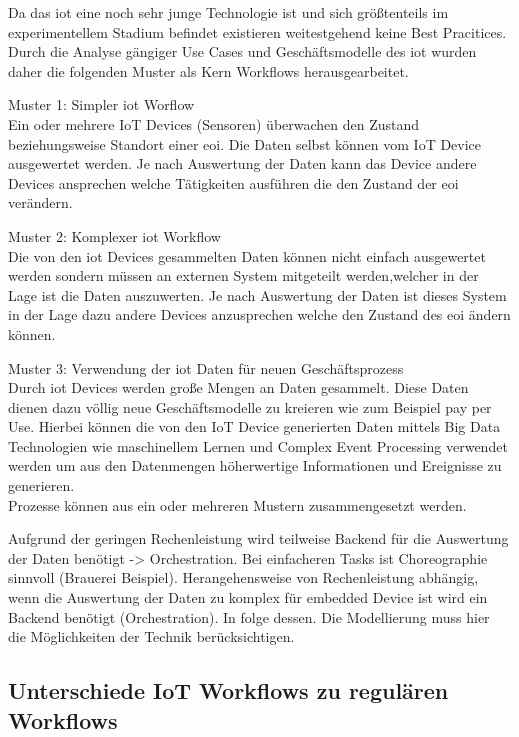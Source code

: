 \documentclass[a4paper, 12pt, twoside, headsepline=true]{scrartcl} %
\begin{document}
Da das \ac{iot} eine noch sehr junge Technologie ist und sich größtenteils im experimentellem Stadium befindet existieren weitestgehend keine Best Pracitices. Durch die Analyse gängiger Use Cases und Geschäftsmodelle \cite{iotbusinessmodels} des \ac{iot} wurden daher die folgenden Muster als Kern Workflows herausgearbeitet.

Muster 1: Simpler \ac{iot} Worflow\\
Ein oder mehrere IoT Devices (Sensoren) überwachen den Zustand beziehungsweise Standort einer \ac{eoi}. Die Daten selbst können vom IoT Device ausgewertet werden. Je nach Auswertung der Daten kann das Device andere Devices ansprechen welche Tätigkeiten ausführen die den Zustand der \ac{eoi} verändern.
 
Muster 2: Komplexer \ac{iot} Workflow\\
Die von den \ac{iot} Devices gesammelten Daten können nicht einfach ausgewertet werden sondern müssen an externen System mitgeteilt werden,welcher in der Lage ist die Daten auszuwerten. Je nach Auswertung der Daten ist dieses System in der Lage dazu andere Devices anzusprechen welche den Zustand des \ac{eoi} ändern können. 

Muster 3: Verwendung der \ac{iot} Daten für neuen Geschäftsprozess \\ 
Durch \ac{iot} Devices werden große Mengen an Daten gesammelt. Diese Daten dienen dazu völlig neue Geschäftsmodelle zu kreieren wie zum Beispiel pay per Use. Hierbei können die von den IoT Device generierten Daten mittels Big Data Technologien wie maschinellem Lernen und Complex Event Processing verwendet werden um aus den Datenmengen höherwertige Informationen und Ereignisse zu generieren. \\

Prozesse können aus ein oder mehreren Mustern zusammengesetzt werden.  

Aufgrund der geringen Rechenleistung wird teilweise Backend für die Auswertung der Daten benötigt -> Orchestration. Bei einfacheren Tasks ist Choreographie sinnvoll (Brauerei Beispiel). Herangehensweise von Rechenleistung abhängig, wenn die Auswertung der Daten zu komplex für embedded Device ist wird ein Backend benötigt (Orchestration). In folge dessen. Die Modellierung muss hier die Möglichkeiten der Technik berücksichtigen. 

\subsection{Unterschiede IoT Workflows zu regulären Workflows}
\end{document}
